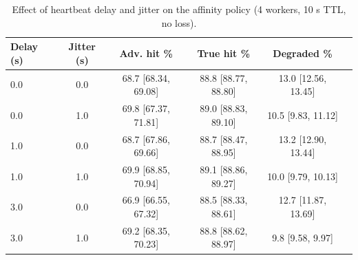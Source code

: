 \begin{table}[t]
\centering
\scriptsize
\setlength{\tabcolsep}{2.5pt}
\caption{Effect of heartbeat delay and jitter on the affinity policy (4 workers, 10 s TTL, no loss).}
\label{tab:staleness-delay}
\begin{tabular}{lccccc}
\toprule
Delay (s) & Jitter (s) & Adv. hit \% & True hit \% & Degraded \% \\
\midrule
0.0 & 0.0 & 68.7 \tiny [68.34, 69.08] & 88.8 \tiny [88.77, 88.80] & 13.0 \tiny [12.56, 13.45] \\
0.0 & 1.0 & 69.8 \tiny [67.37, 71.81] & 89.0 \tiny [88.83, 89.10] & 10.5 \tiny [9.83, 11.12] \\
1.0 & 0.0 & 68.7 \tiny [67.86, 69.66] & 88.7 \tiny [88.47, 88.95] & 13.2 \tiny [12.90, 13.44] \\
1.0 & 1.0 & 69.9 \tiny [68.85, 70.94] & 89.1 \tiny [88.86, 89.27] & 10.0 \tiny [9.79, 10.13] \\
3.0 & 0.0 & 66.9 \tiny [66.55, 67.32] & 88.5 \tiny [88.33, 88.61] & 12.7 \tiny [11.87, 13.69] \\
3.0 & 1.0 & 69.2 \tiny [68.35, 70.23] & 88.8 \tiny [88.62, 88.97] & 9.8 \tiny [9.58, 9.97] \\
\bottomrule
\end{tabular}
\end{table}
